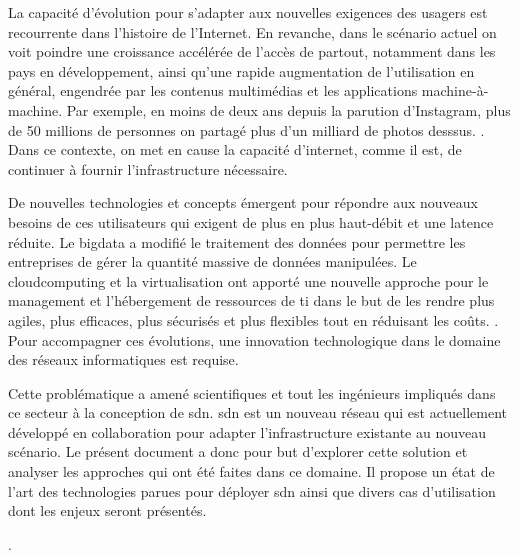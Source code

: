 \par
La capacité d'évolution pour s'adapter aux nouvelles exigences des usagers est recourrente dans l'histoire de l'Internet. 
En revanche, dans le scénario actuel on voit poindre une croissance accélérée de l'accès de partout, notamment dans les pays en développement, ainsi qu'une rapide augmentation de l'utilisation en général, engendrée par les contenus multimédias et les applications machine-à-machine. Par exemple, en moins de deux ans depuis la parution d'Instagram, plus de 50 millions de personnes on partagé plus d'un milliard de photos desssus. \cite{deuxAnsInstagram}.
Dans ce contexte, on met en cause la capacité d'internet, comme il est, de continuer à fournir l'infrastructure nécessaire. \cite{InternetSustainGrowthIntro}
\par
De nouvelles technologies et concepts émergent pour répondre aux nouveaux besoins de ces utilisateurs qui exigent de plus en plus haut-débit et une latence réduite. Le \gls{bigdata} a modifié le traitement des données pour permettre les entreprises de gérer la quantité massive de données manipulées. \cite{IMBigData} Le \gls{cloudcomputing} et la \gls{virtualisation} ont apporté une nouvelle approche pour le management et l'hébergement de ressources de \gls{ti} dans le but de les rendre plus agiles, plus efficaces, plus sécurisés et plus flexibles tout en réduisant les coûts. \cite{CloudComputingIntelVision}. Pour accompagner ces évolutions, une innovation technologique dans le domaine des réseaux informatiques est requise. \cite{InternetEvolutionRoleSoftwareEngineeringConclusion}
\par
Cette problématique a amené scientifiques et tout les ingénieurs impliqués dans ce secteur à la conception de \gls{sdn}. \gls{sdn} est un nouveau  réseau qui est actuellement développé en collaboration pour adapter l'infrastructure existante au nouveau scénario.\cite{OpenFlowStanford} Le présent document a donc pour but d'explorer cette solution et analyser les approches qui ont été faites dans ce domaine. Il propose un état de l'art des technologies parues pour déployer \gls{sdn} ainsi que divers cas d'utilisation dont les enjeux seront présentés.
\par
[un paragraphe pour le plan du texte (de quoi parle chaque section)]
\par
[Un paragraphe pour conclure l'intro et laisser les pistes de mon point de vue et les conclusions trouvées].


